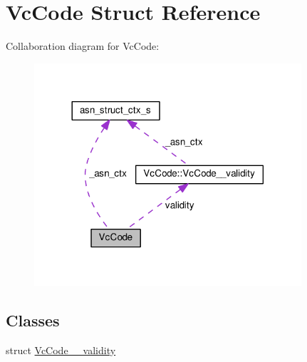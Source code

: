 \hypertarget{structVcCode}{}\section{Vc\+Code Struct Reference}
\label{structVcCode}


Collaboration diagram for Vc\+Code\+:\nopagebreak
\begin{figure}[H]
\begin{center}
\leavevmode
\includegraphics[width=281pt]{structVcCode__coll__graph}
\end{center}
\end{figure}
\subsection*{Classes}
\begin{DoxyCompactItemize}
\item 
struct \hyperlink{structVcCode_1_1VcCode____validity}{Vc\+Code\+\_\+\+\_\+validity}
\end{DoxyCompactItemize}
